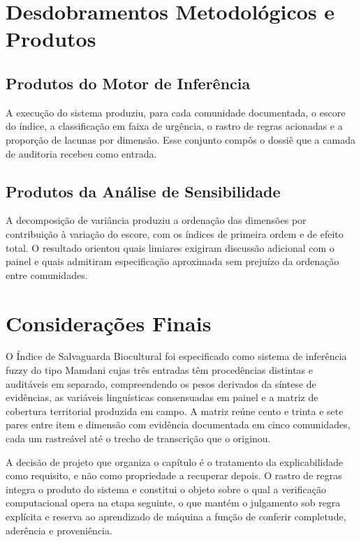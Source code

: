 \documentclass[pdflatex,sn-basic]{sn-jnl}%
\theoremstyle{thmstyleone}%
\theoremstyle{thmstyletwo}%
\theoremstyle{thmstylethree}%
\begin{document}
\section{Desdobramentos Metodológicos e Produtos}

\subsection{Produtos do Motor de Inferência}

A execução do sistema produziu, para cada comunidade documentada, o escore do índice, a classificação em faixa de urgência, o rastro de regras acionadas e a proporção de lacunas por dimensão. Esse conjunto compôs o dossiê que a camada de auditoria recebeu como entrada.

\subsection{Produtos da Análise de Sensibilidade}

A decomposição de variância produziu a ordenação das dimensões por contribuição à variação do escore, com os índices de primeira ordem e de efeito total. O resultado orientou quais limiares exigiram discussão adicional com o painel e quais admitiram especificação aproximada sem prejuízo da ordenação entre comunidades.

\section{Considerações Finais}

O Índice de Salvaguarda Biocultural foi especificado como sistema de inferência fuzzy do tipo Mamdani cujas três entradas têm procedências distintas e auditáveis em separado, compreendendo os pesos derivados da síntese de evidências, as variáveis linguísticas consensuadas em painel e a matriz de cobertura territorial produzida em campo. A matriz reúne cento e trinta e sete pares entre item e dimensão com evidência documentada em cinco comunidades, cada um rastreável até o trecho de transcrição que o originou.

A decisão de projeto que organiza o capítulo é o tratamento da explicabilidade como requisito, e não como propriedade a recuperar depois. O rastro de regras integra o produto do sistema e constitui o objeto sobre o qual a verificação computacional opera na etapa seguinte, o que mantém o julgamento sob regra explícita e reserva ao aprendizado de máquina a função de conferir completude, aderência e proveniência.
\end{document}
